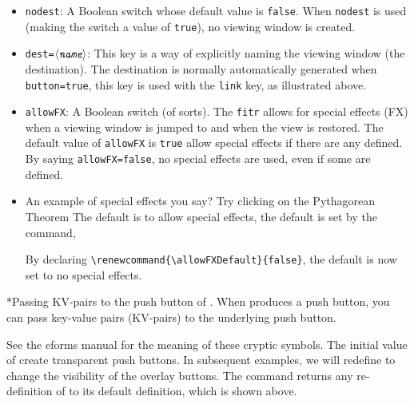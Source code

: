 \documentclass{article}
\makeatletter
\renewcommand\allowFXDefault{false}
\def\meta#1{$\langle\textit{\texttt{#1}}\rangle$}
\renewcommand{\paragraph}
    {\@startsection{paragraph}{4}{0pt}{6pt}{-3pt}
    {\normalfont\normalsize\bfseries}}
\makeatother
\begin{document}
\begin{itemize}
\item \texttt{nodest}: A Boolean switch whose default value is
    \texttt{false}. When \texttt{nodest} is used (making the switch a
    value of \texttt{true}), no viewing window is created.

\item \texttt{dest=\meta{name}}: This key is a way of explicitly naming the
    viewing window (the destination). The destination is normally
    automatically generated when \texttt{button=true}, this key is
    used with the \texttt{link} key, as illustrated above.
\item \texttt{allowFX}: A Boolean switch (of sorts). The \texttt{fitr}
    allows for special effects (FX) when a viewing window is jumped to
    and when the view is restored. The default value of
    \texttt{allowFX} is \texttt{true} allow special effects if there
    are any defined. By saying \texttt{allowFX=false}, no special
    effects are used, even if some are defined.

\item[] An example of special effects you say? Try clicking on the
    Pythagorean Theorem
The default is to allow special effects, the default is set by the command,
\bVerb\takeMeasure{\string\renewcommand\darg{\string\allowFXDefault}\darg{true}}%
\begin{dCmd}[commandchars=!()]{\bxSize}
\renewcommand{\allowFXDefault}{true}
\end{dCmd}
\eVerb By declaring \verb~\renewcommand{\allowFXDefault}{false}~, the default
is now set to no special effects.
\end{itemize}

\paragraph*{Passing KV-pairs to the push button of .}\label{para:Presets} When 
produces a push button, you can pass  key-value pairs (KV-pairs) to
the underlying push button.
\bVerb{}%
\begin{dCmd}[commandchars=!()]{\bxSize}
\newcommand{\overlayPresets}{\H{I}\BG{}\BC{}\S{S}}
\restoreOverlayPresets
\end{dCmd}
\eVerb See the \textsf{eforms} manual for the meaning of these cryptic symbols.
The initial value of  create transparent push
buttons. In subsequent examples, we will redefine  to
change the visibility of the overlay buttons. The command
 returns any re-definition of 
to its default definition, which is shown above.
\end{document}

